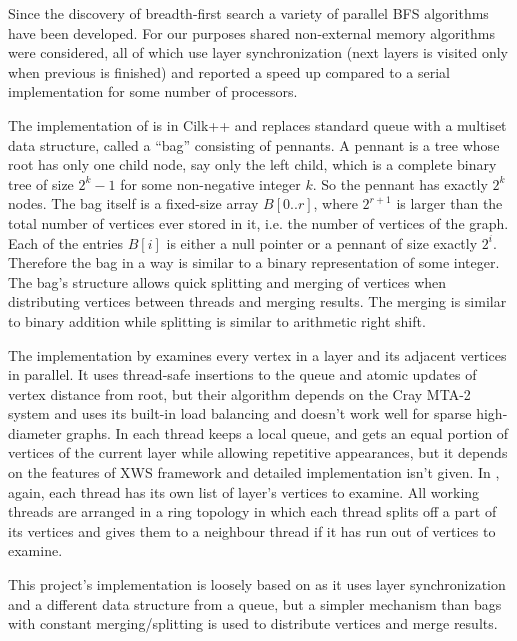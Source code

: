 \documentclass{report}
\theoremstyle{plain}
\theoremstyle{definition}
\theoremstyle{remark}
\begin{document}
Since the discovery of breadth-first search a variety of parallel BFS algorithms have been developed. For our purposes shared non-external memory algorithms \cite{Leiserson, bader2006designing, cong2008solving, zhang2006parallel} were considered, all of which use layer synchronization (next layers is visited only when previous is finished) and reported a speed up compared to a serial implementation for some number of processors.

The implementation of \cite{Leiserson} is in Cilk++ and replaces standard queue with a multiset data structure, called a ``bag'' consisting of pennants. A pennant is a tree whose root has only one child node, say only the left child, which is a complete binary tree of size $2^k-1$ for some non-negative integer $k$. So the pennant has exactly $2^k$ nodes. The bag itself is a fixed-size array $B[0..r]$, where $2^{r+1}$ is larger than the total number of vertices ever stored in it, i.e. the number of vertices of the graph. Each of the entries $B[i]$ is either a null pointer or a pennant of size exactly $2^i$. Therefore the bag in a way is similar to a binary representation of some integer. The bag's structure allows quick splitting and merging of vertices when distributing vertices between threads and merging results. The merging is similar to binary addition while splitting is similar to arithmetic right shift.

The implementation by \cite{bader2006designing} examines every vertex in a layer and its adjacent vertices in parallel. It uses thread-safe insertions to the queue and atomic updates of vertex distance from root, but their algorithm depends on the Cray MTA-2 system and uses its built-in load balancing and doesn't work well for sparse high-diameter graphs.
In \cite{cong2008solving} each thread keeps a local queue, and gets an equal portion of vertices of the current layer while allowing repetitive appearances, but it depends on the features of XWS framework and detailed implementation isn't given.
In \cite{zhang2006parallel}, again, each thread has its own list of layer's vertices to examine. All working threads are arranged in a ring topology in which each thread splits off a part of its vertices and gives them to a neighbour thread if it has run out of vertices to examine.

This project's implementation is loosely based on \cite{Leiserson} as it uses layer synchronization and a different data structure from a queue, but a simpler mechanism than bags with constant merging/splitting is used to distribute vertices and merge results.
\end{document}
